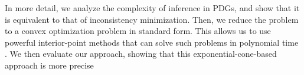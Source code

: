 \documentclass[twoside]{article}
\begin{document}


In more detail,
we analyze the complexity of inference in PDGs, and show
that it is equivalent to that of inconsistency minimization. 
Then, we reduce the problem to a convex optimization problem in standard
form.
This allows us to use powerful interior-point methods
that can solve such problems in polynomial time \parencite{dahl2022primal}. 
We then evaluate our approach, showing 
that this exponential-cone-based approach is more precise
\end{document}
